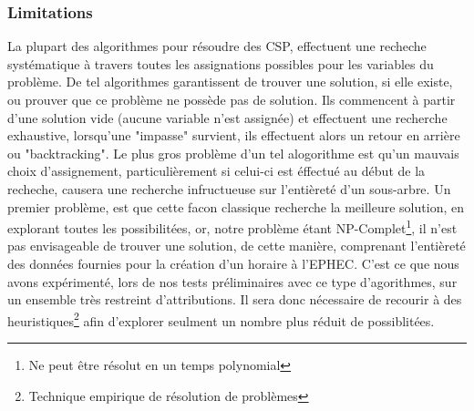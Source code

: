 \subsubsection{Limitations}
La plupart des algorithmes pour résoudre des CSP, effectuent une recheche systématique à travers toutes les assignations possibles pour les variables du problème. De tel algorithmes garantissent de trouver une solution, si elle existe, ou prouver que ce problème ne possède pas de solution.  
Ils commencent à partir d'une solution vide (aucune variable n'est assignée) et effectuent une recherche exhaustive,
lorsqu'une "impasse" survient, ils effectuent alors un retour en arrière ou "backtracking".  \newline
Le plus gros problème d'un tel alogorithme est qu'un mauvais choix d'assignement,
 particulièrement si celui-ci est éffectué au début de la recheche, causera une recherche infructueuse sur l'entièreté d'un sous-arbre. 
\newline
\indent
Un premier problème, est que cette facon classique recherche la meilleure solution, en explorant toutes les possibilitées, or, notre problème étant NP-Complet\footnote{Ne peut être résolut en un temps polynomial}, il n'est pas envisageable de trouver une solution, de cette manière, comprenant l'entièreté des données fournies pour la création d'un horaire à l'EPHEC.  C'est ce que nous avons expérimenté, lors de nos tests préliminaires avec ce type d'agorithmes, sur un ensemble très restreint d'attributions. 
\newline
Il sera donc nécessaire de recourir à des heuristiques\footnote{Technique empirique de résolution de problèmes} afin d'explorer seulment un nombre plus réduit de possiblitées.
\newline

